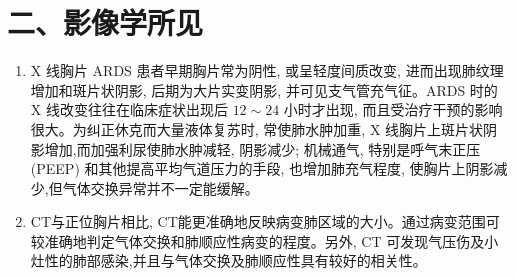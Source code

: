 \documentclass[10pt]{article}
\begin{document}
\section*{二、影像学所见}
\begin{enumerate}
  \item $\mathrm{X}$ 线胸片 ARDS 患者早期胸片常为阴性, 或呈轻度间质改变, 进而出现肺纹理增加和斑片状阴影, 后期为大片实变阴影, 并可见支气管充气征。ARDS 时的 X 线改变往往在临床症状出现后 $12 \sim 24$ 小时才出现, 而且受治疗干预的影响很大。为纠正休克而大量液体复苏时, 常使肺水肿加重, $\mathrm{X}$ 线胸片上斑片状阴影增加,而加强利尿使肺水肿减轻, 阴影减少; 机械通气, 特别是呼气末正压(PEEP) 和其他提高平均气道压力的手段, 也增加肺充气程度, 使胸片上阴影减少,但气体交换异常并不一定能缓解。

  \item CT与正位胸片相比, CT能更准确地反映病变肺区域的大小。通过病变范围可较准确地判定气体交换和肺顺应性病变的程度。另外, CT 可发现气压伤及小灶性的肺部感染,并且与气体交换及肺顺应性具有较好的相关性。

\end{enumerate}
\end{document}
